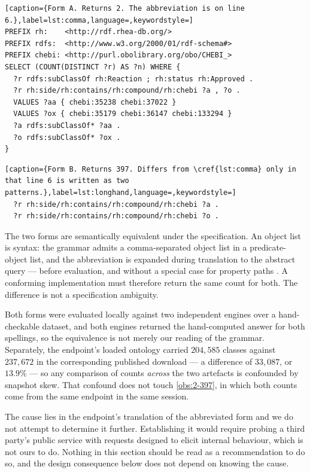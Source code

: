 \begin{lstlisting}[caption={Form A. Returns 2. The abbreviation is on line 6.},label=lst:comma,language=,keywordstyle=]
PREFIX rh:    <http://rdf.rhea-db.org/>
PREFIX rdfs:  <http://www.w3.org/2000/01/rdf-schema#>
PREFIX chebi: <http://purl.obolibrary.org/obo/CHEBI_>
SELECT (COUNT(DISTINCT ?r) AS ?n) WHERE {
  ?r rdfs:subClassOf rh:Reaction ; rh:status rh:Approved .
  ?r rh:side/rh:contains/rh:compound/rh:chebi ?a , ?o .
  VALUES ?aa { chebi:35238 chebi:37022 }
  VALUES ?ox { chebi:35179 chebi:36147 chebi:133294 }
  ?a rdfs:subClassOf* ?aa .
  ?o rdfs:subClassOf* ?ox .
}
\end{lstlisting}

\begin{lstlisting}[caption={Form B. Returns 397. Differs from \cref{lst:comma} only in that line 6 is written as two patterns.},label=lst:longhand,language=,keywordstyle=]
  ?r rh:side/rh:contains/rh:compound/rh:chebi ?a .
  ?r rh:side/rh:contains/rh:compound/rh:chebi ?o .
\end{lstlisting}

The two forms are semantically equivalent under the specification. An object
list is syntax: the grammar admits a comma-separated object list in a
predicate-object list, and the abbreviation is expanded during translation to
the abstract query --- before evaluation, and without a special case for
property paths \citep{Harris2013}. A conforming implementation must therefore
return the same count for both. The difference is not a specification
ambiguity.

\begin{remark}
\label{rem:control}
Both forms were evaluated locally against two independent engines
\citep{RDFLib,Pyoxigraph} over a hand-checkable dataset, and both engines
returned the hand-computed answer for both spellings, so the equivalence is not
merely our reading of the grammar. Separately, the endpoint's loaded ontology
carried $204{,}585$ classes against $237{,}672$ in the corresponding published
download --- a difference of $33{,}087$, or $13.9\%$ --- so any comparison of
counts \emph{across} the two artefacts is confounded by snapshot skew. That
confound does not touch \cref{obs:2-397}, in which both counts come from the
same endpoint in the same session.
\end{remark}

\begin{remark}
\label{rem:no-probing}
The cause lies in the endpoint's translation of the abbreviated form and we do
not attempt to determine it further. Establishing it would require probing a
third party's public service with requests designed to elicit internal
behaviour, which is not ours to do. Nothing in this section should be read as a
recommendation to do so, and the design consequence below does not depend on
knowing the cause.
\end{remark}

